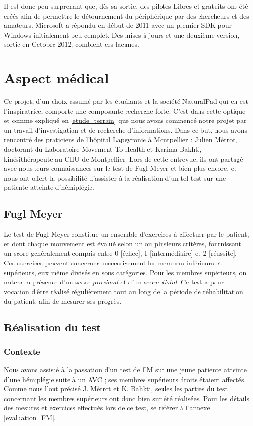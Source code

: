 \documentclass[french,12pt]{report}
\begin{document}
Il est donc peu surprenant que, dès sa sortie, des pilotes Libres et gratuits
ont été créés afin de permettre le détournement du périphérique par des
chercheurs et des amateurs. Microsoft a répondu en début de 2011 avec un
premier SDK pour Windows initialement peu complet. Des mises à jours et une
deuxième version, sortie en Octobre 2012, comblent ces lacunes.

		
		\section{Aspect médical} \label{lapeyronie}		%
Ce projet, d'un choix assumé par les étudiants et la société NaturalPad qui en est l'inspiratrice, comporte une composante recherche forte. C'est dans cette optique et comme expliqué en \ref{etude_terrain} que nous avons commencé notre projet par un travail d'investigation et de recherche d'informations. Dans ce but, nous avons rencontré des praticiens de l'hôpital Lapeyronie à Montpellier : Julien Métrot, doctorant du Laboratoire Movement To Health et Karima Bakhti, kinésithérapeute au CHU de Montpellier. Lors de cette entrevue, ils ont partagé avec nous leurs connaissances sur le test de Fugl Meyer et bien plus encore, et nous ont offert la possibilité d'assister à la réalisation d'un tel test sur une patiente atteinte d'hémiplégie.
	\subsection{Fugl Meyer}
Le test de Fugl Meyer constitue un ensemble d'exercices à effectuer par le patient, et dont chaque mouvement est évalué selon un ou plusieurs critères, fournissant un score généralement compris entre 0 [échec], 1 [intermédiaire] et 2 [réussite]. Ces exercices peuvent concerner successivement les membres inférieurs et supérieurs, eux même divisés en sous catégories. Pour les membres supérieurs, on notera la présence d'un score \textit{proximal} et d'un score \textit{distal}. Ce test a pour vocation d'être réalisé régulièrement tout au long de la période de réhabilitation du patient, afin de mesurer ses progrès.
	\subsection{Réalisation du test}
				\subsubsection{Contexte}
Nous avons assisté à la passation d'un test de FM sur une jeune patiente atteinte d'une hémiplégie suite à un AVC ; ses membres supérieurs droits étaient affectés. Comme nous l'ont précisé J. Métrot et K. Bahkti, seules les parties du test concernant les membres supérieurs ont donc bien sur été réalisées. Pour les détails des mesures et exercices effectués lors de ce test, se référer à l'annexe \ref{evaluation_FM}.
\end{document}
